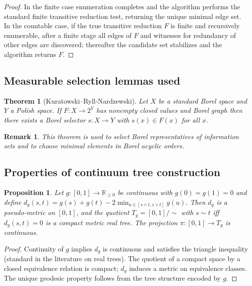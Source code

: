 \documentclass[11pt]{article}
\newtheorem{theorem}[definition]{Theorem}
\newtheorem{proposition}[definition]{Proposition}
\newtheorem{remark}[definition]{Remark}
\begin{document}
\begin{proof}
In the finite case enumeration completes and the algorithm performs the
standard finite transitive reduction test, returning the unique minimal
edge set. In the countable case, if the true transitive reduction $F$ is
finite and recursively enumerable, after a finite stage all edges of $F$
and witnesses for redundancy of other edges are discovered; thereafter
the candidate set stabilizes and the algorithm returns $F$.
\end{proof}

\subsection*{Measurable selection lemmas used}
\begin{theorem}[Kuratowski–Ryll‑Nardzewski]
Let $X$ be a standard Borel space and $Y$ a Polish space. If
$F:X\to 2^Y$ has nonempty closed values and Borel graph then there exists
a Borel selector $s:X\to Y$ with $s(x)\in F(x)$ for all $x$.
\end{theorem}

\begin{remark}
This theorem is used to select Borel representatives of information sets
and to choose minimal elements in Borel acyclic orders.
\end{remark}

\subsection*{Properties of continuum tree construction}
\begin{proposition}
Let $g:[0,1]\to\mathbb R_{\ge0}$ be continuous with $g(0)=g(1)=0$ and
define $d_g(s,t)=g(s)+g(t)-2\min_{u\in[s\wedge t,s\vee t]}g(u)$. Then $d_g$
is a pseudo‑metric on $[0,1]$, and the quotient $T_g=[0,1]/\!\sim$ with
$s\sim t$ iff $d_g(s,t)=0$ is a compact metric real tree. The projection
$\pi:[0,1]\to T_g$ is continuous.
\end{proposition}

\begin{proof}[Proof]
Continuity of $g$ implies $d_g$ is continuous and satisfies the triangle
inequality (standard in the literature on real trees). The quotient of a
compact space by a closed equivalence relation is compact; $d_g$ induces a
metric on equivalence classes. The unique geodesic property follows from
the tree structure encoded by $g$.
\end{proof}
\end{document}
